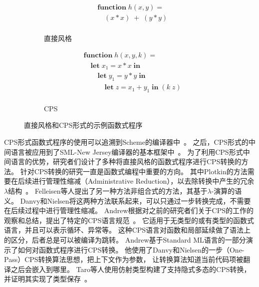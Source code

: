\begin{figure}
    \centering
    \vspace{2ex}
    \begin{subfigure}[b]{0.4\textwidth}
        \flushright
     \begin{equation}
        \nonumber
        \begin{aligned}
        &  \mathbf{function}\; h(x,y) = \\
        & \quad (x*x)\; +\; (y*y) \\
        \end{aligned}
    \end{equation}
    \caption{直接风格}
        \label{fig:ori2}
    \end{subfigure}
    \begin{subfigure}[b]{0.5\textwidth}
        \flushleft
        \begin{equation}
            \nonumber
            \begin{aligned}
            & \mathbf{function}\; h(x,y,k)= \\
            & \quad \mathbf{let}\; x_1=x*x\; \mathbf{in} \\
            & \quad\quad \mathbf{let}\; y_1=y*y\; \mathbf{in} \\
            & \quad\quad\quad \mathbf{let}\; z=x_1+y_1\; \mathbf{in}\; (k\; z) \\
            \end{aligned}
        \end{equation}
        \caption{CPS}
        \label{fig:cps2}
    \end{subfigure}
    \caption{直接风格和CPS形式的示例函数式程序}\label{cpsdirect}
  \end{figure}

CPS形式函数式程序的使用可以追溯到Scheme的编译器中~\cite{saint2006shard}。
之后，CPS形式的中间语言被应用到了SML-New Jersey编译器的基本框架中~\cite{woodruff2018optimising}。
为了利用CPS形式中间语言的优势，研究者们设计了多种将直接风格的函数式程序进行CPS转换的方法。
针对CPS转换的研究一直是函数式编程中重要的方向。
其中Plotkin的方法需要在后续进行管理性缩减（Administrative Reduction），以去除转换中产生的冗余$\lambda$结构~\cite{plotkin1977lcf}。
Felleisen等人提出了另一种方法非组合式的方法，其基于$\lambda$-演算的语义。
Danvy和Nielsen将这两种方法联系起来，可以只通过一步转换完成，不需要在后续过程中进行管理性缩减\cite{danvy2007one}。
Andrew根据对之前的研究者们关于CPS的工作的观察和总结，提出了特定的CPS语言规范~\cite{kennedy2007compiling}。
它适用于无类型的或有类型的函数式语言，并且可以表示循环、异常等。
这种CPS语言对函数和局部延续做了语法上的区分，后者总是可以被编译为跳转。
Andrew基于Standard ML语言的一部分演示了如何对函数式程序进行CPS转换。
他使用了Danvy和Nielsen的一步（One-Pass）CPS转换算法思想，把上下文作为参数，
让转换算法知道当前代码项被翻译之后会嵌入到哪里。
Taro等人使用仿射类型构建了支持隐式多态的CPS转换，并证明其实现了类型保存~\cite{taro2021cpstrans}。

